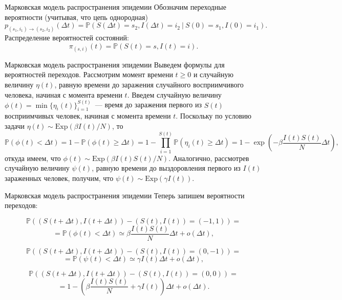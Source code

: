 \documentclass[aspectratio=169]{beamer}
\newcommand{\prob}[1]{\mathbb{P}\left(#1\right)}
\begin{document}
\begin{frame}{Марковская модель распространения эпидемии}
    Обозначим переходные вероятности (учитывая, что цепь однородная)
    \[ p_{(s_1, i_1) \to (s_2, i_2)}(\Delta t) = \mathbb{P} \left( S(\Delta t) = s_2, I(\Delta t) = i_2 \ | \ S(0) = s_1, I(0) = i_1 \right). \]
    Распределение вероятностей состояний:
    \[ \pi_{(s, i)}(t) = \mathbb{P} \left( S(t) = s, I(t) = i \right). \]
\end{frame}
\begin{frame}{Марковская модель распространения эпидемии}
    Выведем формулы для вероятностей переходов. Рассмотрим момент времени $t \geqslant 0$ и случайную величину $\eta(t)$, равную времени до заражения случайного восприимчивого человека, начиная с момента времени $t$. Введем случайную величину $\phi(t) = \min\{ \eta_i(t) \}_{i=1}^{S(t)}$~--- время до заражения первого из $S(t)$ восприимчивых человек, начиная с момента времени $t$. Поскольку по условию задачи $\eta(t) \sim \mathrm{Exp}(\beta I(t) / N)$, то
    \[ \prob{\phi(t) < \Delta t} = 1 - \prob{\phi(t) \geqslant \Delta t} = 1 - \prod_{i=1}^{S(t)} \prob{\eta_i(t) \geqslant \Delta t} = 1 - \exp\left( - \beta \dfrac{I(t)S(t)}{N} \Delta t \right), \]
    откуда имеем, что $\phi(t) \sim \mathrm{Exp}\left( \beta I(t) S(t) / N \right)$.
    Аналогично, рассмотрев случайную величину $\psi(t)$, равную времени до выздоровления первого из $I(t)$ зараженных человек, получим, что $\psi(t) \sim \mathrm{Exp}\left( \gamma I(t) \right)$.
\end{frame}
\begin{frame}{Марковская модель распространения эпидемии}
    Теперь запишем вероятности переходов\footnotemark[1]:
    \vspace{-0.5cm}
    \begin{block}{}
        \[ \prob{\left(S(t + \Delta t), I(t + \Delta t)\right) - \left(S(t), I(t)\right) = \left(-1, 1\right)} = \]
        \[ = \prob{\phi(t) < \Delta t} \simeq \beta \dfrac{I(t)S(t)}{N} \Delta t + o(\Delta t), \]
    \end{block}
    \vspace{-1cm}
    \begin{block}{}
        \[ \prob{\left(S(t + \Delta t), I(t + \Delta t)\right) - \left(S(t), I(t)\right) = \left(0, -1\right)} = \]
        \[ = \prob{\psi(t) < \Delta t} \simeq \gamma I(t) \Delta t + o(\Delta t), \]
    \end{block}
    \vspace{-1cm}
    \begin{block}{}
        \[ \prob{\left(S(t + \Delta t), I(t + \Delta t)\right) - \left(S(t), I(t)\right) = \left(0, 0\right)} = \]
        \[ = 1 - \left(\beta \dfrac{I(t)S(t)}{N} + \gamma I(t) \right)\Delta t + o(\Delta t). \]
    \end{block}
\end{frame}
\end{document}
